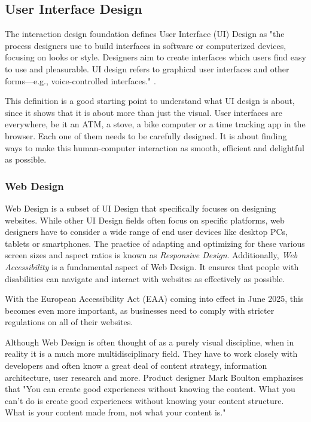 \newpage
\subsection{User Interface Design}
The interaction design foundation defines User Interface (UI) Design as "the process designers use
to build interfaces in software or computerized devices, focusing on looks or style. Designers aim
to create interfaces which users find easy to use and pleasurable. UI design refers to graphical
user interfaces and other forms—e.g., voice-controlled interfaces."
.

This definition is a good starting point to understand what UI design is about, since it
shows that it is about more than just the visual. User interfaces are everywhere, be it an ATM, a
stove, a bike computer or a time tracking app in the browser. Each one of them needs to be
carefully designed. It is about finding ways to make this human-computer interaction as smooth,
efficient and delightful as possible.

\subsubsection{Web Design}
Web Design is a subset of UI Design that specifically focuses on designing websites. While other UI
Design fields often focus on specific platforms, web designers have to consider a wide range of end
user devices like desktop PCs, tablets or smartphones. The practice of adapting and optimizing for
these various screen sizes and aspect ratios is known as \textit{Responsive Design}. Additionally,
\textit{Web Accessibility} is a fundamental aspect of Web Design. It ensures that people with
disabilities can navigate and interact with websites as effectively as possible.

With the European Accessibility Act (EAA) coming into effect in June 2025, this becomes even more
important, as businesses need to comply with stricter regulations on all of their websites.

Although Web Design is often thought of as a purely visual discipline, when in reality it is a much
more multidisciplinary field. They have to work closely with developers and often know a great deal
of content strategy, information architecture, user research and more. Product designer Mark Boulton
emphazises that "You can create good experiences without knowing the content. What you can’t do is
create good experiences without knowing your content structure. What is your content made from, not
what your content is." 

